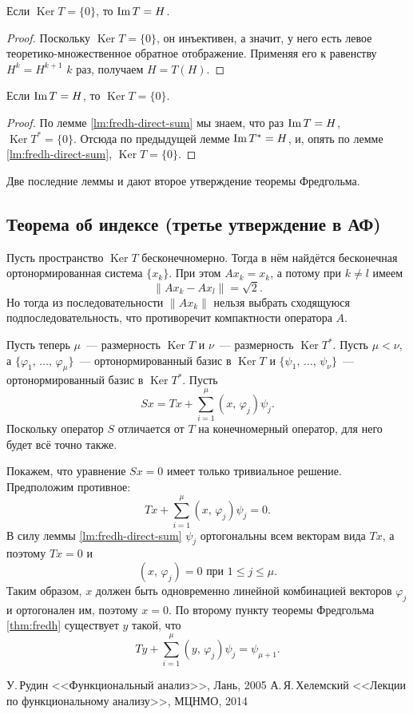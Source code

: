 \documentclass{notes}
\DeclareMathOperator{\Ker}{Ker}
\begin{document}
	\begin{lm}
		Если $\Ker T = \{0\}$, то $\operatorname{Im} T = H$.
		\begin{proof}
			Поскольку $\Ker T = \{0\}$, он инъективен, а значит, у него есть левое теоретико-множественное обратное отображение. Применяя его к равенству $H^k = H^{k + 1}$ $k$ раз, получаем $H = T(H)$.
		\end{proof}
	\end{lm}
 
	\begin{lm}
		Если $\operatorname{Im} T = H$, то $\Ker T = \{0\}$.
		\begin{proof}
			По лемме \ref{lm:fredh-direct-sum} мы знаем, что раз $\operatorname{Im} T = H$, $\Ker T^* = \{0\}$. Отсюда по предыдущей лемме $\operatorname{Im} T^* = H$, и, опять по лемме \ref{lm:fredh-direct-sum}, $\Ker T = \{0\}$.
		\end{proof}
	\end{lm}

	Две последние леммы и дают второе утверждение теоремы Фредгольма.

\subsection{Теорема об индексе (третье утверждение в АФ)}

	Пусть пространство $\Ker T$ бесконечномерно. Тогда в нём найдётся бесконечная ортонормированная система $\{x_k\}$. При этом $Ax_k = x_k$, а потому при $k \neq l$ имеем
	\[
		\|Ax_k - Ax_l\| = \sqrt{2}.
	\]
	Но тогда из последовательности $\|Ax_k\|$ нельзя выбрать сходящуюся подпоследовательность, что противоречит компактности оператора $A$.

	Пусть теперь $\mu$~--- размерность $\Ker T$ и $\nu$~--- размерность $\Ker T^*$. Пусть $\mu < \nu$, а $\{\varphi_1, \, \ldots, \, \varphi_{\mu}\}$~--- ортонормированный базис в $\Ker T$ и $\{\psi_1, \, \ldots, \, \psi_{\nu}\}$~--- ортонормированный базис в $\Ker T^*$. Пусть
	\[
		Sx = Tx + \sum\limits_{i = 1}^{\mu} (x, \, \varphi_j) \psi_j.
	\]
	Поскольку оператор $S$ отличается от $T$ на конечномерный оператор, для него будет всё точно также. 

	Покажем, что уравнение $Sx = 0$ имеет только тривиальное решение. Предположим противное:
	\[
		Tx + \sum\limits_{i = 1}^{\mu} (x, \, \varphi_j) \psi_j = 0.
	\] 
	В силу леммы \ref{lm:fredh-direct-sum} $\psi_j$ ортогональны всем векторам вида $Tx$, а поэтому $Tx = 0$ и 
	\[
		(x, \, \varphi_j) = 0 \text{ при } 1 \leqslant j \leqslant \mu.
	\]
	Таким образом, $x$ должен быть одновременно линейной комбинацией векторов $\varphi_j$ и ортогонален им, поэтому $x = 0$. По второму пункту теоремы Фредгольма \ref{thm:fredh} существует $y$ такой, что
	\[
		Ty + \sum\limits_{i = 1}^{\mu} (y,\, \varphi_j) \psi_j = \psi_{\mu + 1}.
	\]

	






\begin{thebibliography}{}

 У.$\,$Рудин <<Функциональный анализ>>, Лань, 2005
 А.$\,$Я.$\,$Хелемский <<Лекции по функциональному анализу>>, МЦНМО, 2014

\end{thebibliography}{}
\end{document}
